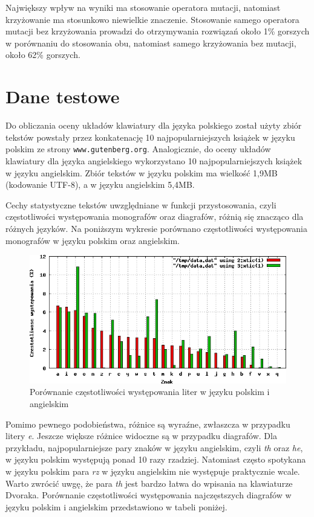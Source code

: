 \documentclass[brudnopis]{xmgr}
\begin{document}
Największy wpływ na wyniki ma stosowanie operatora mutacji, natomiast krzyżowanie ma stosunkowo niewielkie znaczenie. Stosowanie samego operatora mutacji bez krzyżowania prowadzi do otrzymywania rozwiązań około 1\% gorszych w porównaniu do stosowania obu, natomiast samego krzyżowania bez mutacji, około 62\% gorszych.



\section{Dane testowe}

Do obliczania oceny układów klawiatury dla języka polskiego został użyty zbiór tekstów powstały przez konkatenację 10 najpopularniejszych książek w języku polskim ze strony {\tt www.gutenberg.org}. Analogicznie, do oceny układów klawiatury dla języka angielskiego wykorzystano 10 najpopularniejszych książek w języku angielskim. Zbiór tekstów w języku polskim ma wielkość 1,9MB (kodowanie UTF-8), a w języku angielskim 5,4MB.

Cechy statystyczne tekstów uwzględniane w funkcji przystosowania, czyli częstotliwości występowania monografów oraz diagrafów, różnią się znacząco dla różnych języków. Na poniższym wykresie porównano częstotliwości występowania monografów w języku polskim oraz angielskim.

\begin{figure}[!tbh]
\centering
\includegraphics[width=.8\hsize]{fig/frequencies}
\caption{Porównanie częstotliwości występowania liter w języku polskim i angielskim}
\end{figure}

Pomimo pewnego podobieństwa, różnice są wyraźne, zwłaszcza w przypadku litery \emph{e}. Jeszcze większe różnice widoczne są w przypadku diagrafów. Dla przykładu, najpopularniejsze pary znaków w języku angielskim, czyli \emph{th} oraz \emph{he}, w języku polskim występują ponad 10 razy rzadziej. Natomiast często spotykana w języku polskim para \emph{rz} w języku angielskim nie występuje praktycznie wcale. Warto zwrócić uwgę, że para \emph{th} jest bardzo łatwa do wpisania na klawiaturze Dvoraka. Porównanie częstotliwości występowania najczęstszych diagrafów w języku polskim i angielskim przedstawiono w tabeli poniżej.\newline
\end{document}
